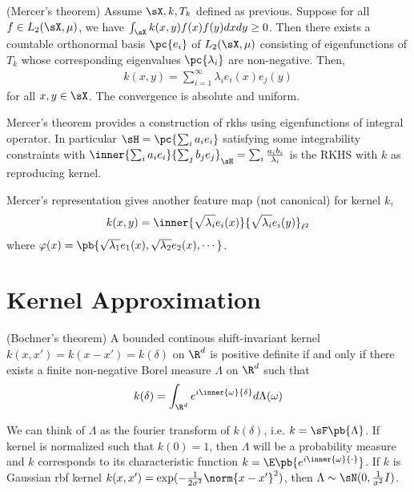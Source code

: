 \documentclass[11pt]{article}
\begin{document}
\begin{theorem}
    (Mercer's theorem) Assume $\sX,k,T_k$ defined as previous. Suppose for all $f\in L_2(\sX,\mu)$, we have $\int_{\sX} k(x,y) f(x)f(y) dxdy \geq 0$. Then there exists a countable orthonormal basis $\pc{e_i}$ of $L_2(\sX,\mu)$ consisting of eigenfunctions of $T_k$ whose corresponding eigenvalues $\pc{\lambda_i}$ are non-negative. Then,
    \begin{align}
        k(x,y)
            = \sum_{i=1}^{\infty} \lambda_i e_i(x) e_j(y)
    \end{align}
    for all $x,y\in\sX$. The convergence is absolute and uniform.
\end{theorem}

Mercer's theorem provides a construction of rkhs using eigenfunctions of integral operator. In particular $\sH = \pc{\sum_i a_i e_i}$ satisfying some integrability constraints with $\inner{\sum_i a_ie_i}{\sum_j b_j e_j}_{\sH} = \sum_i \frac{ a_ib_i}{\lambda_i}$ is the RKHS with $k$ as reproducing kernel.

Mercer's representation gives another feature map (not canonical) for kernel $k$,
\begin{align}
    k(x,y) 
        = \inner{\sqrt{\lambda_i}e_i(x)}{\sqrt{\lambda_i}e_i(y)}_{\ell^2}
\end{align}
where $\varphi(x) = \pb{ \sqrt{\lambda_1} e_1(x), \sqrt{\lambda_2} e_2(x), \cdots }$.

\section{Kernel Approximation}


\begin{theorem}
    \label{bochner}
    (Bochner's theorem) A bounded continous shift-invariant kernel $k(x,x') = k(x-x')=k(\delta)$ on $\R^d$ is positive definite if and only if there exists a finite non-negative Borel measure $\Lambda$ on $\R^d$ such that 
    \begin{align}
        k(\delta)
            = \int_{\R^d} e^{i\inner{\omega}{\delta}} d\Lambda(\omega)
    \end{align}
\end{theorem}

We can think of $\Lambda$ as the fourier transform of $k(\delta)$, i.e. $k = \sF\pb{\Lambda}$. If kernel is normalized such that $k(0)=1$, then $\Lambda$ will be a probability measure and $k$ corresponds to its characteristic function $k = \E\pb{ e^{i\inner{\omega}{\cdot}} }$. If $k$ is Gaussian rbf kernel $k(x,x') = \exp(-\frac{1}{2\sigma^2}\norm{x-x'}^2)$, then $\Lambda \sim \sN(0,\frac{1}{\sigma^2}I)$. 
\end{document}

